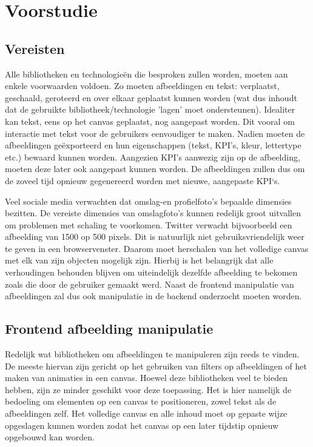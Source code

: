 
\chapter{Voorstudie}
\vspace{-3cm}
\section{Vereisten} \label{vereisten}
Alle bibliotheken en technologie\"{e}n die besproken zullen worden, moeten aan enkele voorwaarden voldoen. Zo moeten afbeeldingen en tekst: verplaatst, geschaald, geroteerd en over elkaar geplaatst kunnen worden (wat dus inhoudt dat de gebruikte bibliotheek/technologie 'lagen' moet ondersteunen). Idealiter kan tekst, eens op het canvas geplaatst, nog aangepast worden. Dit vooral om interactie met tekst voor de gebruikers eenvoudiger te maken. Nadien moeten de afbeeldingen ge\"{e}xporteerd en hun eigenschappen (tekst, KPI's, kleur, lettertype etc.) bewaard kunnen worden. Aangezien KPI's aanwezig zijn op de afbeelding, moeten deze later ook aangepast kunnen worden. De afbeeldingen zullen dus om de zoveel tijd opnieuw gegenereerd worden met nieuwe, aangepaste KPI`s. 

Veel sociale media verwachten dat omslag-en profielfoto's bepaalde dimensies bezitten. De vereiste dimensies van omslagfoto's kunnen redelijk groot uitvallen om problemen met schaling te voorkomen. Twitter verwacht bijvoorbeeld een afbeelding van 1500 op 500 pixels. Dit is natuurlijk niet gebruiksvriendelijk weer te geven in een browservenster. Daarom moet herschalen van het volledige canvas met elk van zijn objecten mogelijk zijn. Hierbij is het belangrijk dat alle verhoudingen behouden blijven om uiteindelijk dezelfde afbeelding te bekomen zoals die door de gebruiker gemaakt werd. Naast de frontend manipulatie van afbeeldingen zal dus ook manipulatie in de backend onderzocht moeten worden.  

\section{Frontend afbeelding manipulatie}
Redelijk wat bibliotheken om afbeeldingen te manipuleren zijn reeds te vinden. De meeste hiervan zijn gericht op het gebruiken van filters op afbeeldingen of het maken van animaties in een canvas. Hoewel deze bibliotheken veel te bieden hebben, zijn ze minder geschikt voor deze toepassing. Het is hier namelijk de bedoeling om elementen op een canvas te positioneren, zowel tekst als de afbeeldingen zelf. Het volledige canvas en alle inhoud moet op gepaste wijze opgeslagen kunnen worden zodat het canvas op een later tijdstip opnieuw opgebouwd kan worden. 

